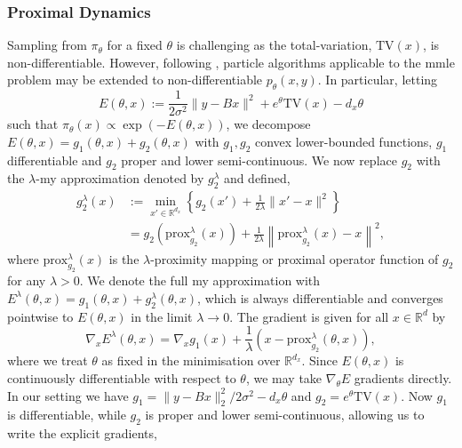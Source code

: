\subsubsection{Proximal Dynamics}

Sampling from $\pi_\theta$ for a fixed $\theta$ is challenging as the total-variation, $\mathrm{TV}(x)$, is non-differentiable. However, following \citet{encinar2025proximal}, particle algorithms applicable to the \gls*{mmle} problem may be extended to non-differentiable $p_\theta(x,y)$. In particular, letting
\begin{equation*}
    E(\theta,x):=\frac{1}{2\sigma^2}\|y-Bx\|^2+e^\theta\mathrm{TV}(x)-d_x\theta
\end{equation*}
such that $\pi_\theta(x)\propto \exp(-E(\theta,x))$, we decompose $E(\theta,x)=g_1(\theta,x)+g_2(\theta,x)$ with $g_1,g_2$ convex lower-bounded functions, $g_1$ differentiable and $g_2$ proper and lower semi-continuous. We now replace $g_2$ with the $\lambda$-\gls*{my} approximation denoted by $g_2^\lambda$ and defined,
\begin{equation*}
\begin{aligned}
    g_2^\lambda(x)&:=\min_{x'\in\mathbb{R}^{d_x}}\left\{g_2(x')+\frac{1}{2\lambda}\|x'-x\|^2\right\}\\
    &=g_2\left(\mathrm{prox}^{\lambda}_{g_2}(x)\right)+\frac{1}{2\lambda}\left\|\mathrm{prox}^{\lambda}_{g_2}(x)-x\right\|^2,
\end{aligned}
\end{equation*}
where $\mathrm{prox}^\lambda_{g_2}(x)$ is the $\lambda$-proximity mapping or proximal operator function of $g_2$ for any $\lambda>0$. We denote the full \gls*{my} approximation with $E^\lambda(\theta,x)=g_1(\theta,x)+g_2^\lambda(\theta,x)$, which is always differentiable and converges pointwise to $E(\theta,x)$ in the limit $\lambda\rightarrow0$. The gradient is given for all $x\in\mathbb{R}^d$ by
\begin{equation*}
    \nabla_xE^\lambda(\theta,x)=\nabla_x g_1(x)+\frac{1}{\lambda}(x-\mathrm{prox}^\lambda_{g_2}(\theta,x)),
\end{equation*}
where we treat $\theta$ as fixed in the minimisation over $\mathbb{R}^{d_x}$. Since $E(\theta,x)$ is continuously differentiable with respect to $\theta$, we may take $\nabla_\theta E$ gradients directly. In our setting we have $g_1=\|y-Bx\|^2_2/2\sigma^2-d_x\theta$ and $g_2=e^\theta\mathrm{TV}(x)$. Now $g_1$ is differentiable, while $g_2$ is proper and lower semi-continuous, allowing us to write the explicit gradients,
